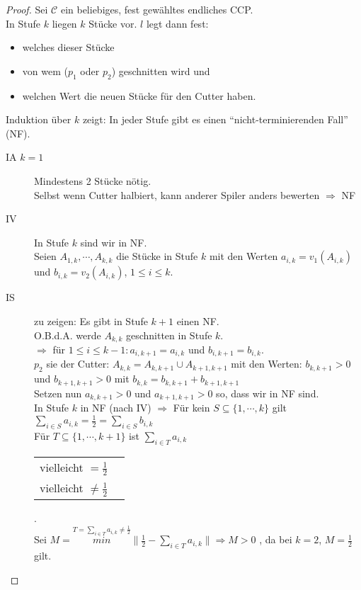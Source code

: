 \documentclass[a4paper,10pt]{scrartcl}
\begin{document}
\begin{proof}
 Sei $\mathcal{C}$ ein beliebiges, fest gewähltes endliches CCP.\\
 In Stufe $k$ liegen $k$ Stücke vor. $l$ legt dann fest:
 \begin{itemize}
  \item welches dieser Stücke
  \item von wem ($p_1$ oder $p_2$) geschnitten wird und
  \item welchen Wert die neuen Stücke für den Cutter haben.
 \end{itemize}
 Induktion über $k$ zeigt: In jeder Stufe gibt es einen ``nicht-terminierenden Fall'' (NF).
 \begin{description}
  \item[IA $k=1$] Mindestens 2 Stücke nötig.\\Selbst wenn Cutter halbiert, kann anderer Spiler anders bewerten $\Rightarrow$ NF
  \item[IV] In Stufe $k$ sind wir in NF.\\Seien $A_{1,k},\cdots,A_{k,k}$ die Stücke in Stufe $k$ mit den Werten $a_{i,k}=v_1(A_{i,k})$
   und $b_{i,k}=v_2(A_{i,k})$, $1\leq i\leq k$.
  \item[IS] zu zeigen: Es gibt in Stufe $k+1$ einen NF.\\O.B.d.A. werde $A_{k,k}$ geschnitten in Stufe $k$.\\
   $\Rightarrow$ für $1\leq i\leq k-1: a_{i,k+1}=a_{i,k}$ und $b_{i,k+1}=b_{i,k}$.\\
   $p_2$ sie der Cutter: $A_{k,k}=A_{k,k+1}\cup A_{k+1,k+1}$ mit den Werten: $b_{k,k+1}>0$ und $b_{k+1,k+1}>0$ mit $b_{k,k}=b_{k,k+1}+b_{k+1,k+1}
   $\\ Setzen nun $a_{k,k+1}>0$ und $a_{k+1,k+1}>0$ so, dass wir in NF sind.\\
   In Stufe $k$ in NF (nach IV) $\Rightarrow$ Für kein $S\subseteq\{1,\cdots,k\}$ gilt $\sum\limits_{i\in S}a_{i,k}=\frac{1}{2}=
   \sum\limits_{i\in S}b_{i,k}$\\
   Für $T\subseteq\{1,\cdots,k+1\}$ ist $\sum\limits_{i\in T}a_{i,k}$\begin{tabular}{cc}vielleicht $=\frac{1}{2}$\\vielleicht $\neq\frac{1}{2}$
   \end{tabular}.\\
   Sei $M=\stackrel{T=\sum\limits_{i\in T}a_{i,k}\neq\frac{1}{2}}{min} \|\frac{1}{2}-\sum\limits_{i\in T}a_{i,k}\| \Rightarrow M>0$ , da
   bei $k=2$, $M=\frac{1}{2}$ gilt.\\

\end{description}
\end{proof}
\end{document}
